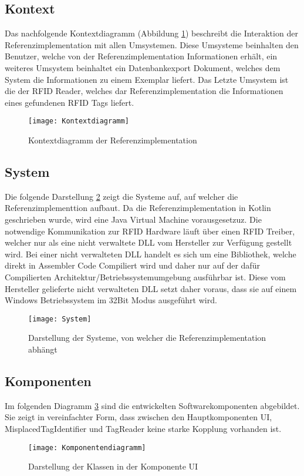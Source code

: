 \subsection{Kontext}

Das nachfolgende Kontextdiagramm (Abbildung \ref{fig:Kontextdiagramm}) beschreibt die Interaktion der Referenzimplementation mit allen Umsystemen. Diese Umsysteme beinhalten den Benutzer, welche von der Referenzimplementation Informationen erhält, ein weiteres Umsystem beinhaltet ein Datenbankexport Dokument, welches dem System die Informationen zu einem Exemplar liefert. Das Letzte Umsystem ist die der RFID Reader, welches dar Referenzimplementation die Informationen eines gefundenen RFID Tags liefert.
\begin{figure}[htb]
	\centering
	\texttt{[image: Kontextdiagramm]}
	\caption{Kontextdiagramm der Referenzimplementation}
	\label{fig:Kontextdiagramm}
\end{figure}

\subsection{System}
Die folgende Darstellung \ref{fig:System} zeigt die Systeme auf, auf welcher die Referenzimplementtion aufbaut.
Da die Referenzimplementation in Kotlin geschrieben wurde, wird eine Java Virtual Machine vorausgesetzuz. Die notwendige Kommunikation zur RFID Hardware läuft über einen RFID Treiber, welcher nur als eine nicht verwaltete \gls{DLL} vom Hersteller zur Verfügung gestellt wird. Bei einer nicht verwalteten \gls{DLL} handelt es sich um eine Bibliothek, welche direkt in Assembler Code Compiliert wird und daher nur auf der dafür Compilierten Architektur/Betriebssystemumgebung ausführbar ist. Diese vom Hersteller gelieferte nicht verwalteten \gls{DLL} setzt daher voraus, dass sie auf einem Windows Betriebssystem im 32Bit Modus ausgeführt wird.
\begin{figure}[htb]
	\centering
	\texttt{[image: System]}
	\caption{Darstellung der Systeme, von welcher die Referenzimplementation abhängt}
	\label{fig:System}
\end{figure}

\subsection{Komponenten}
Im folgenden Diagramm \ref{fig:Components} sind die entwickelten Softwarekomponenten abgebildet. Sie zeigt in vereinfachter Form, dass zwischen den Hauptkomponenten UI, MisplacedTagIdentifier und TagReader keine starke Kopplung vorhanden ist.
\begin{figure}[htb]
	\centering
	\texttt{[image: Komponentendiagramm]}
	\caption{Darstellung der Klassen in der Komponente UI}
	\label{fig:Components}
\end{figure}

